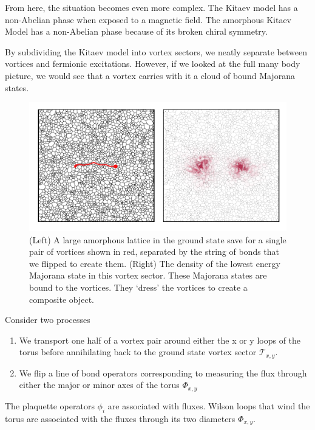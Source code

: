 From here, the situation becomes even more complex. The Kitaev model has a non-Abelian phase when exposed to a magnetic field. The amorphous Kitaev Model has a non-Abelian phase because of its broken chiral symmetry.

By subdividing the Kitaev model into vortex sectors, we neatly separate between vortices and fermionic excitations. However, if we looked at the full many body picture, we would see that a vortex carries with it a cloud of bound Majorana states.

\begin{figure}
\hypertarget{fig:majorana_bound_states}{%
\centering
\includegraphics[width=1\textwidth,height=\textheight]{figure_code/amk_chapter/majorana_bound_states/majorana_bound_states.pdf}
\caption{(Left) A large amorphous lattice in the ground state save for a single pair of vortices shown in red, separated by the string of bonds that we flipped to create them. (Right) The density of the lowest energy Majorana state in this vortex sector. These Majorana states are bound to the vortices. They `dress' the vortices to create a composite object.}\label{fig:majorana_bound_states}
}
\end{figure}

Consider two processes

\begin{enumerate}
\def\labelenumi{\arabic{enumi})}
\item
  We transport one half of a vortex pair around either the x or y loops of the torus before annihilating back to the ground state vortex sector \(\mathcal{T}_{x,y}\).
\item
  We flip a line of bond operators corresponding to measuring the flux through either the major or minor axes of the torus \(\mathcal{\Phi}_{x,y}\)
\end{enumerate}

The plaquette operators \(\phi_i\) are associated with fluxes. Wilson loops that wind the torus are associated with the fluxes through its two diameters \(\mathcal{\Phi}_{x,y}\).

